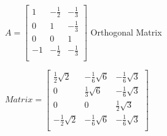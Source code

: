 \documentclass{article}
\begin{document}
$A=\begin{bmatrix}
1 &-\frac{1}{2} &-\frac{1}{3}\\
0 &1 &-\frac{1}{3}\\
0 &0 &1\\
-1 &-\frac{1}{2} &-\frac{1}{3}\\
\end{bmatrix}
$
Orthogonal Matrix

$Matrix=\begin{bmatrix}
\frac{1}{2}\sqrt{2} &-\frac{1}{6}\sqrt{6} &-\frac{1}{6}\sqrt{3}\\
0 &\frac{1}{3}\sqrt{6} &-\frac{1}{6}\sqrt{3}\\
0 &0 &\frac{1}{2}\sqrt{3}\\
-\frac{1}{2}\sqrt{2} &-\frac{1}{6}\sqrt{6} &-\frac{1}{6}\sqrt{3}\\
\end{bmatrix}
$
\end{document}
